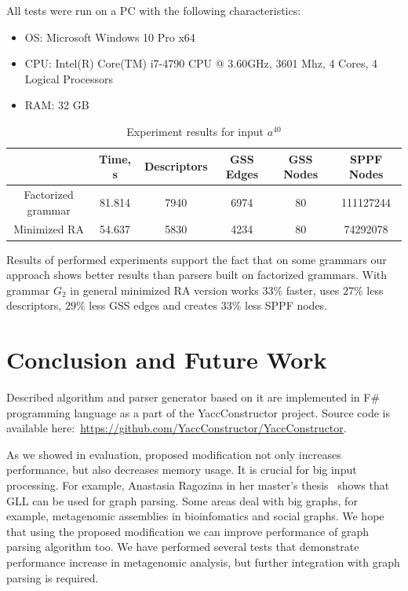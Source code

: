 \documentclass[runningheads,a4paper]{llncs}
\begin{document}
All tests were run on a PC with the following characteristics:
\begin{itemize}
    \item OS: Microsoft Windows 10 Pro x64
    \item CPU: Intel(R) Core(TM) i7-4790 CPU @ 3.60GHz, 3601 Mhz, 4 Cores, 4 Logical Processors
    \item RAM: 32 GB
\end{itemize}

\begin{table}[ht]   
\begin{center}
    \begin{tabular}{ | c | c | c | c | c | c | }
        \hline
                           & Time, s & Descriptors & GSS Edges & GSS Nodes & SPPF Nodes   \\ \hline
        Factorized grammar & 81.814  & 7940        & 6974      & 80        & 111127244  \\ \hline
        Minimized RA       & 54.637  & 5830        & 4234      & 80        & 74292078  \\ \hline
    \end{tabular}
\end{center}
\caption{Experiment results for input $a^{40}$}
\label{expTable}
\end{table}



Results of performed experiments support the fact that on some grammars our approach shows better results than parsers built on factorized grammars.
With grammar $G_2$ in general minimized RA version works $33\%$ faster, uses $27\%$ less descriptors, $29\%$ less GSS edges and creates $33\%$ less SPPF nodes.

\section{Conclusion and Future Work}

Described algorithm and parser generator based on it are implemented in F\# programming language as a part of the YaccConstructor project.
Source code is available here:~\url{https://github.com/YaccConstructor/YaccConstructor}.

As we showed in evaluation, proposed modification not only increases performance, but also decreases memory usage. 
It is crucial for big input processing.
For example, Anastasia Ragozina in her master's thesis~\cite{ragozina} shows that GLL can be used for graph parsing.  
Some areas deal with big graphs, for example, metagenomic assemblies in bioinfomatics and social graphs.
We hope that using the proposed modification we can improve performance of graph parsing algorithm too. 
We have performed several tests that demonstrate performance increase in metagenomic analysis, but further integration with graph parsing is required.
\end{document}

